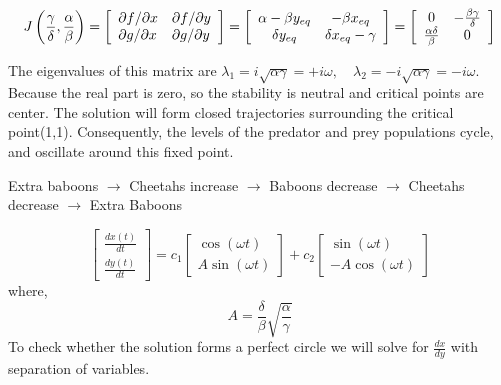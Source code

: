 \documentclass[12pt]{article}
\begin{document}
\begin{equation*}
    J \left( \frac { \gamma } { \delta } , \frac { \alpha } { \beta } \right) = \left[ \begin{array} { l l } \partial f / \partial x & \partial f / \partial y \\ \partial g / \partial x & \partial g / \partial y \end{array} \right] = \left[ \begin{array} { c c } \alpha - \beta y_{eq} & - \beta x_{eq} \\ \delta y_{eq} & \delta x_{eq} - \gamma \end{array} \right] = \left[ \begin{array} { c c } 0 & - \frac { \beta \gamma } { \delta } \\ \frac { \alpha \delta } { \beta } & 0 \end{array} \right]
\end{equation*}


The eigenvalues of this matrix are
$ \lambda _ { 1 } = i \sqrt { \alpha \gamma } = +i \omega , \quad \lambda _ { 2 } = - i \sqrt { \alpha \gamma } = - i \omega. $
Because the real part is zero, so the stability is neutral and critical points are center. The solution will form closed trajectories surrounding the critical point(1,1). Consequently, the levels of
the predator and prey populations cycle, and oscillate around this fixed point.

Extra baboons $ \rightarrow $ Cheetahs increase $ \rightarrow $ Baboons decrease $ \rightarrow $ Cheetahs decrease $ \rightarrow $ Extra Baboons

\begin{equation*}
     \left[\begin{array} { c } \frac { d x ( t ) } { d t } \\ \frac { d y ( t ) } { d t } \end{array} \right] = c _ { 1 } \left[\begin{array} { c } \cos ( \omega t ) \\ A \sin ( \omega t ) \end{array} \right] + c _ { 2 } \left[ \begin{array} { c } \sin ( \omega t ) \\ - A \cos ( \omega t ) \end{array} \right]
\end{equation*}
where,
\begin{equation*}
    A = \frac { \delta } { \beta } \sqrt { \frac { \alpha } { \gamma } }
\end{equation*}
To check whether the solution forms a perfect circle we will solve for $ \frac { d x} { d y } $ with separation of variables.
\end{document}
